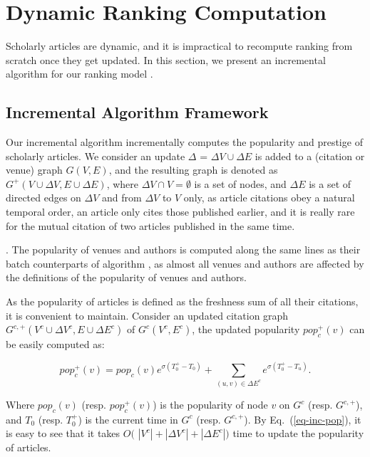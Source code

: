 \section{Dynamic Ranking Computation}
\label{sec-incAlg}

Scholarly articles are dynamic, and it is impractical to recompute ranking from scratch once they get updated. In this section, we present an incremental algorithm for our ranking model \ensemblerank.


\subsection{Incremental Algorithm Framework}
\label{subsec-inc-alg}




Our incremental algorithm \incensemble incrementally computes the popularity and prestige of scholarly articles.
We consider an update $\Delta$ = $\Delta V\cup\Delta E$ is added to a   (citation or venue) graph $G(V, E)$,
and the resulting graph is denoted as $G^+(V\cup\Delta V, E\cup\Delta E)$, where
$\Delta V\cap V = \emptyset$ is a set of nodes, and $\Delta E$ is a set of directed edges on $\Delta V$ and from $\Delta V$ to $V$ only, as article citations obey a natural temporal order, \ie an article only cites those published earlier, and it is really rare for the mutual citation of two articles published in the same time.


.
The popularity of venues and authors is computed along the same lines as their batch counterparts of algorithm \batensemble,
as almost all venues and authors are affected  by the definitions of the popularity of venues and authors.


As the popularity of articles is defined as the freshness sum of all their citations, it is convenient to maintain. Consider an updated citation graph $G^{c,+}(V^c\cup\Delta V^c, E\cup\Delta E^c)$ of $G^c(V^c, E^c)$,  the updated popularity $pop_{c}^+(v)$ can be easily computed as:
\begin{small}
\begin{equation}\label{eq-inc-pop}
pop_c^+(v) = pop_c(v) {e^{\sigma (T^+_0-T_0)}} + \sum_{(u,v)\in \Delta E^c} {e^{\sigma (T^+_0-T_u)}}.
\end{equation}
\end{small}
\noindent
Where $pop_c(v)$ (resp. $pop_c^+(v)$) is the popularity of node $v$ on $G^c$ (resp. $G^{c,+}$), and 
 $T_0$ (resp. $T^+_0$) is the current time in $G^c$ (resp. $G^{c,+}$). 
%
By Eq.~(\ref{eq-inc-pop}), it is easy to see that it takes $O($ $|V^c|+|\Delta V^c|+|\Delta E^c|)$ time to update the popularity of articles.



